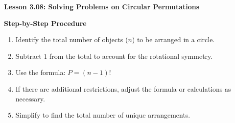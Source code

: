 \begin{center}
\textbf{Lesson 3.08: Solving Problems on Circular Permutations}
\end{center}

\vspace*{-1.5ex}


\noindent\textbf{Step-by-Step Procedure}

\begin{enumerate}
    \item Identify the total number of objects (\(n\)) to be arranged in a circle.
    \item Subtract \(1\) from the total to account for the rotational symmetry.
    \item Use the formula:    \(P = (n-1)!\)

    \item If there are additional restrictions, adjust the formula or calculations as necessary.
    \item Simplify to find the total number of unique arrangements.
\end{enumerate}
